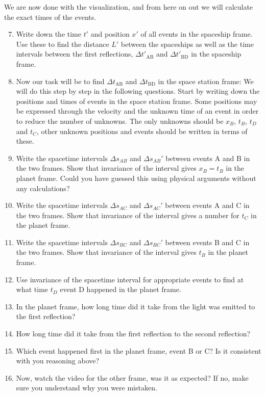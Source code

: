 {\begin{multicols}{2}
\begin{enumerate}
\end{enumerate}
We are now done with the visualization, and from here on out we will calculate the exact times of the events.
\begin{enumerate}
\setcounter{enumi}{6}
\item Write down the time $t'$ and position $x'$ of all events in the spaceship frame. Use these to find the distance $L'$ between the spaceships as well as the time intervals between the first reflections, $\Delta t'_\mathrm{AB}$ and $\Delta t'_\mathrm{BD}$ in the spaceship frame.

\item Now our task will be to find $\Delta t_\mathrm{AB}$ and $\Delta t_\mathrm{BD}$ in the space station frame: We will do this step by step in the following questions. Start by writing down the positions and times of events in the space station frame. Some positions may be expressed through the velocity and the unknown time of an event in order to reduce the number of unknowns. The only unknowns should be $x_B$, $t_B$, $t_D$ and $t_C$, other unknown positions and events should be written in terms of these.

\item Write the spacetime intervals $\Delta s_{AB}$ and $\Delta s_{AB}'$ between events A and B in the two frames. Show that invariance of the interval gives $x_B=t_B$ in the planet frame. Could you have guessed this using physical arguments without any calculations?

\item  Write the spacetime intervals $\Delta s_{AC}$ and $\Delta s_{AC}'$ between events A and C in the two frames. Show that invariance of the interval gives a number for $t_C$ in the planet frame. 
\item Write the spacetime intervals $\Delta s_{BC}$ and $\Delta s_{BC}'$ between events B and C in the two frames. Show that invariance of the interval gives $t_B$ in the planet frame.
\item Use invariance of the spacetime interval for appropriate events to find at what time $t_D$ event D happened in the planet frame. 
\item In the planet frame, how long time did it take from the light was emitted to the first reflection? 
\item How long time did it take from the first reflection to the second reflection?
\item Which event happened first in the planet frame, event B or C? Is it consistent with you reasoning above?
\item Now, watch the video for the other frame, was it as expected? If no, make sure you understand why you were mistaken.
\end{enumerate}


\end{multicols}}
